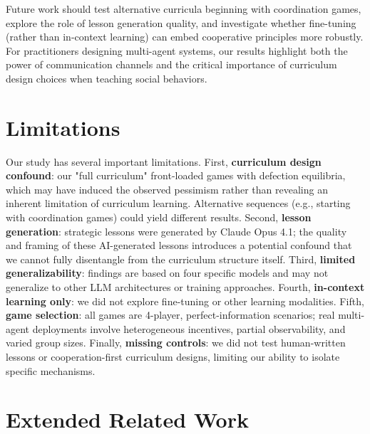\documentclass[11pt]{article}
\begin{document}
Future work should test alternative curricula beginning with coordination games, explore the role of lesson generation quality, and investigate whether fine-tuning (rather than in-context learning) can embed cooperative principles more robustly. For practitioners designing multi-agent systems, our results highlight both the power of communication channels and the critical importance of curriculum design choices when teaching social behaviors.

\section*{Limitations}

Our study has several important limitations. First, \textbf{curriculum design confound}: our "full curriculum" front-loaded games with defection equilibria, which may have induced the observed pessimism rather than revealing an inherent limitation of curriculum learning. Alternative sequences (e.g., starting with coordination games) could yield different results. Second, \textbf{lesson generation}: strategic lessons were generated by Claude Opus 4.1; the quality and framing of these AI-generated lessons introduces a potential confound that we cannot fully disentangle from the curriculum structure itself. Third, \textbf{limited generalizability}: findings are based on four specific models and may not generalize to other LLM architectures or training approaches. Fourth, \textbf{in-context learning only}: we did not explore fine-tuning or other learning modalities. Fifth, \textbf{game selection}: all games are 4-player, perfect-information scenarios; real multi-agent deployments involve heterogeneous incentives, partial observability, and varied group sizes. Finally, \textbf{missing controls}: we did not test human-written lessons or cooperation-first curriculum designs, limiting our ability to isolate specific mechanisms.




\appendix
\section{Extended Related Work}
\label{app:extended_related}
\end{document}
